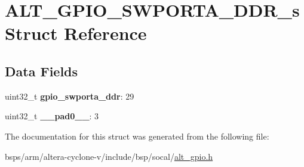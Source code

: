 \hypertarget{structALT__GPIO__SWPORTA__DDR__s}{}\section{A\+L\+T\+\_\+\+G\+P\+I\+O\+\_\+\+S\+W\+P\+O\+R\+T\+A\+\_\+\+D\+D\+R\+\_\+s Struct Reference}
\label{structALT__GPIO__SWPORTA__DDR__s}
\subsection*{Data Fields}
\begin{DoxyCompactItemize}
\item 
\mbox{\label{structALT__GPIO__SWPORTA__DDR__s_a146b8aae36b5732dbe9b8f9b9266cbc2}} 
uint32\+\_\+t {\bfseries gpio\+\_\+swporta\+\_\+ddr}\+: 29
\item 
\mbox{\label{structALT__GPIO__SWPORTA__DDR__s_a8f4a6a224e99fb3ced23f923ce1d8b9b}} 
uint32\+\_\+t {\bfseries \+\_\+\+\_\+pad0\+\_\+\+\_\+}\+: 3
\end{DoxyCompactItemize}


The documentation for this struct was generated from the following file\+:\begin{DoxyCompactItemize}
\item 
bsps/arm/altera-\/cyclone-\/v/include/bsp/socal/\mbox{\hyperlink{alt__gpio_8h}{alt\+\_\+gpio.\+h}}\end{DoxyCompactItemize}
